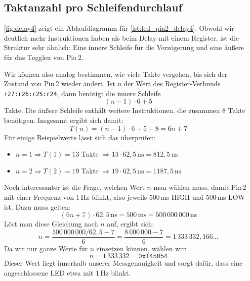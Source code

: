 \documentclass[a4paper,12pt]{article}
\begin{document}
\subsection{Taktanzahl pro Schleifendurchlauf}

\autoref{fig:delay4} zeigt ein Ablaufdiagramm für \autoref{lst:led_pin2_delay4}. 
Obwohl wir deutlich mehr Instruktionen haben als beim Delay mit einem Register, 
ist die Struktur sehr ähnlich: Eine innere Schleife für die Verzögerung und 
eine äußere für das Togglen von Pin 2.

Wir können also analog bestimmen, wie viele Takte vergehen, 
bis sich der Zustand von Pin 2 wieder ändert. 
Ist \( n \) der Wert des Register-Verbunds \texttt{r27:r26:r25:r24}, 
dann benötigt die innere Schleife
\[
    (n - 1) \cdot 6 + 5
\]
Takte. Die äußere Schleife enthält weitere Instruktionen, 
die zusammen 8 Takte benötigen. Insgesamt ergibt sich damit:
\[
    T(n) = (n - 1) \cdot 6 + 5 + 8 = 6n + 7
\]
Für einige Beispielwerte lässt sich das überprüfen:
\begin{itemize}
    \item
	\( n = 1 \Rightarrow T(1) = 13 \) Takte
	\( \Rightarrow 13 \cdot 62{,}5\,\text{ns} = 812{,}5\,\text{ns} \)
    \item
	\( n = 2 \Rightarrow T(2) = 19 \) Takte
	\( \Rightarrow 19 \cdot 62{,}5\,\text{ns} = 1187{,}5\,\text{ns} \)
\end{itemize}
Noch interessanter ist die Frage, welchen Wert \( n \) man wählen muss, 
damit Pin 2 mit einer Frequenz von 1 Hz blinkt, also jeweils 500 ms HIGH und
500 ms LOW ist.  Dazu muss gelten:
\[
    (6n + 7) \cdot 62{,}5\,\text{ns}
	= 500\,\text{ms} = 500\,000\,000\,\text{ns}
\]
Löst man diese Gleichung nach \( n \) auf, ergibt sich:
\[
    n = \frac{500\,000\,000 / 62{,}5 - 7}{6}
	= \frac{8\,000\,000 - 7}{6} = 1\,333\,332{,}166\ldots
\]
Da wir nur ganze Werte für \( n \) einsetzen können, wählen wir:
\[
n = 1\,333\,332 = \texttt{0x145854}
\]
Dieser Wert liegt innerhalb unserer Messgenauigkeit und 
sorgt dafür, dass eine angeschlossene LED etwa mit 1 Hz blinkt.
\end{document}
